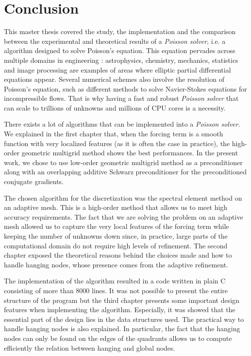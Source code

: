 \chapter*{Conclusion}

This master thesis covered the study, the implementation and the comparison between the experimental and theoretical results of a \textit{Poisson solver}, i.e. a algorithm designed to solve Poisson's equation. This equation pervades across multiple domains in engineering : astrophysics, chemistry, mechanics, statistics and image processing are examples of areas where elliptic partial differential equations appear. Several numerical schemes also involve the resolution of Poisson's equation, such as different methods to solve Navier-Stokes equations for incompressible flows. That is why having a fast and robust \textit{Poisson solver} that can scale to trillions of unknowns and millions of CPU cores is a necessity. 

There exists a lot of algorithms that can be implemented into a \textit{Poisson solver}. We explained in the first chapter that, when the forcing term is a smooth function with very localized features (as it is often the case in practice), the high-order geometric multigrid method shows the best performances. In the present work, we chose to use low-order geometric multigrid method as a preconditioner along with an overlapping additive Schwarz preconditioner for the preconditioned conjugate gradients.  

The chosen algorithm for the discretization was the spectral element method on an adaptive mesh. This is a high-order method that allows us to meet high accuracy requirements. The fact that we are solving the problem on an adaptive mesh allowed us to capture the very local features of the forcing term while keeping the number of unknowns down since, in practice, large parts of the computational domain do not require high levels of refinement. The second chapter exposed the theoretical reasons behind the choices made and how to handle hanging nodes, whose presence comes from the adaptive refinement. 

The implementation of the algorithm resulted in a code written in plain C consisting of more than 8000 lines. It was not possible to present the entire structure of the program but the third chapter presents some important design features when implementing the algorithm. Especially, it was showed that the essential part of the design lies in the data structures used. The practical way to handle hanging nodes is also explained. In particular, the fact that the hanging nodes can only be found on the edges of the quadrants allows us to compute efficiently the relation between hanging and global nodes. 

